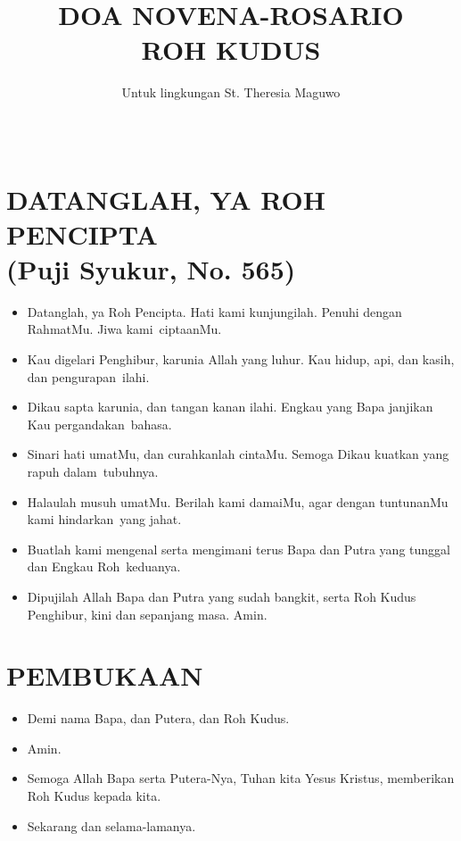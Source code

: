 \documentclass{scrartcl}
\title{DOA NOVENA-ROSARIO\\ ROH KUDUS}
\author{Untuk lingkungan St. Theresia Maguwo}
\date{~}
\newcommand{\roleSay}[2]{\begin{itemize} \item[#1:] #2 \end{itemize}}
\newcommand{\BU}[1]{\roleSay{U}{#1}}
\newcommand{\BP}[1]{\roleSay{P}{#1}}
\begin{document}
\maketitle
\section{DATANGLAH, YA ROH PENCIPTA\\ (Puji Syukur, No. 565)}

\roleSay{Bersama}{Datanglah, ya Roh Pencipta. Hati kami kunjungilah. Penuhi
dengan RahmatMu. Jiwa kami~ciptaanMu.}

\roleSay{Putri}{Kau digelari Penghibur, karunia Allah yang luhur. Kau hidup,
api, dan kasih, dan pengurapan~ilahi.}

\roleSay{Putra}{Dikau sapta karunia, dan tangan kanan ilahi. Engkau yang
Bapa janjikan Kau pergandakan~bahasa.}

\roleSay{Putri}{Sinari hati umatMu, dan curahkanlah cintaMu. Semoga Dikau
kuatkan yang rapuh dalam~tubuhnya.}

\roleSay{Putra}{Halaulah musuh umatMu. Berilah kami damaiMu, agar dengan
tuntunanMu kami hindarkan~yang jahat.}

\roleSay{Putri}{Buatlah kami mengenal serta mengimani terus Bapa dan Putra yang
tunggal dan Engkau Roh~keduanya.}

\roleSay{Bersama}{Dipujilah Allah Bapa dan Putra yang sudah bangkit, serta Roh
Kudus Penghibur, kini dan sepanjang masa. Amin.}

\section{PEMBUKAAN}

\BP{Demi nama Bapa, dan Putera, dan Roh Kudus.}

\BU{Amin.}

\BP{Semoga Allah Bapa serta Putera-Nya, Tuhan kita Yesus Kristus,
memberikan Roh Kudus kepada kita.}

\BU{Sekarang dan selama-lamanya.}
\end{document}
